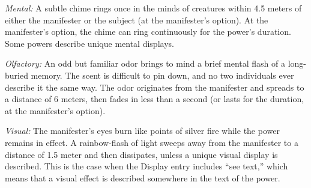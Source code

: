 \textit{Mental:} A subtle chime rings once in the minds of creatures within 4.5 meters of either the manifester or the subject (at the manifester's option). At the manifester's option, the chime can ring continuously for the power's duration. Some powers describe unique mental displays.

\textit{Olfactory:} An odd but familiar odor brings to mind a brief mental flash of a long-buried memory. The scent is difficult to pin down, and no two individuals ever describe it the same way. The odor originates from the manifester and spreads to a distance of 6 meters, then fades in less than a second (or lasts for the duration, at the manifester's option).

\textit{Visual:} The manifester's eyes burn like points of silver fire while the power remains in effect. A rainbow-flash of light sweeps away from the manifester to a distance of 1.5 meter and then dissipates, unless a unique visual display is described. This is the case when the Display entry includes ``see text,'' which means that a visual effect is described somewhere in the text of the power.